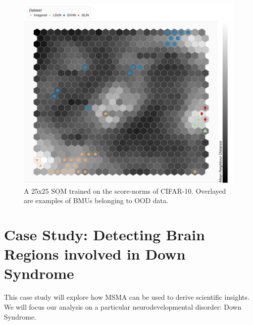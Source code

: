 \begin{figure}[tbhp]
\centering
\includegraphics[width=\textwidth]{figures/cifar_som_hex.png}
\caption{A 25x25 SOM trained on the score-norms of CIFAR-10. Overlayed are examples of BMUs belonging to OOD data.}
\label{fig:som-cifar}
\end{figure}





\section{Case Study: Detecting Brain Regions involved in Down Syndrome}

This case study will explore how MSMA can be used to derive scientific insights. We will focus our analysis on a particular neurodevelopmental disorder: Down Syndrome. 


